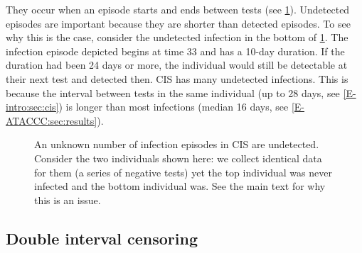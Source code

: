 \documentclass[12pt, letterpaper]{article} %
\begin{document}
They occur when an episode starts and ends between tests (see \cref{perf-test:fig:truncation}).
Undetected episodes are important because they are shorter than detected episodes.
To see why this is the case, consider the undetected infection in the bottom of \cref{perf-test:fig:truncation}.
The infection episode depicted begins at time 33 and has a 10-day duration.
If the duration had been 24 days or more, the individual would still be detectable at their next test and detected then.
CIS has many undetected infections.
This is because the interval between tests in the same individual (up to 28 days, see \cref{E-intro:sec:cis}) is longer than most infections (median 16 days, see \cref{E-ATACCC:sec:results}).
\begin{figure}
  \caption[Undetected episodes in CIS data]{An unknown number of infection episodes in CIS are undetected. Consider the two individuals shown here: we collect identical data for them (a series of negative tests) yet the top individual was never infected and the bottom individual was. See the main text for why this is an issue. \label{perf-test:fig:truncation}}
\end{figure}

\subsection{Double interval censoring} \label{perf-test:sec:interval-censoring}
\end{document}
